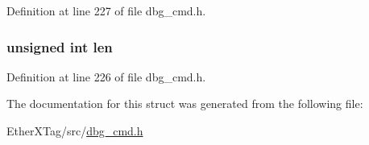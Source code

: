 Definition at line 227 of file dbg\-\_\-cmd.\-h.

\hypertarget{structdbg__cmd__type__upload__xscope__data_a77124bd5f7e31e6fffc19f335da0c23f}{
\subsubsection[{len}]{\setlength{\rightskip}{0pt plus 5cm}unsigned int len}}\label{structdbg__cmd__type__upload__xscope__data_a77124bd5f7e31e6fffc19f335da0c23f}


Definition at line 226 of file dbg\-\_\-cmd.\-h.



The documentation for this struct was generated from the following file\-:\begin{DoxyCompactItemize}
\item 
Ether\-X\-Tag/src/\hyperlink{dbg__cmd_8h}{dbg\-\_\-cmd.\-h}\end{DoxyCompactItemize}
